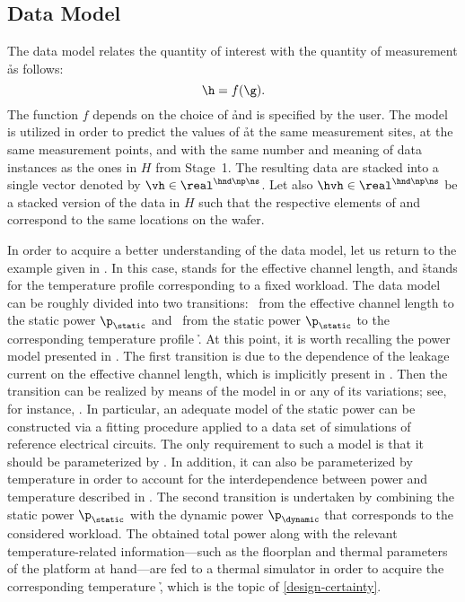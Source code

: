 \subsection{Data Model}

The data model relates the quantity of interest \g with the quantity of
measurement \h as follows:
\[
  \h = f(\g).
\]
The function $f$ depends on the choice of \h and is specified by the user. The
model is utilized in order to predict the values of \h at the same measurement
sites, at the same measurement points, and with the same number and meaning of
data instances as the ones in $H$ from Stage~1. The resulting data are stacked
into a single vector denoted by $\vh \in \real^{\hnd \np \ns}$. Let also $\hvh
\in \real^{\hnd \np \ns}$ be a stacked version of the data in $H$ such that the
respective elements of \vh and \hvh correspond to the same locations on the
wafer.

In order to acquire a better understanding of the data model, let us return to
the example given in . In this case, \g stands for the
effective channel length, and \h stands for the temperature profile
corresponding to a fixed workload. The data model can be roughly divided into
two transitions: \one~from the effective channel length \g to the static power
$\p_\static$ and \two~from the static power $\p_\static$ to the corresponding
temperature profile \h. At this point, it is worth recalling the power model
presented in . The first transition is due to the dependence
of the leakage current on the effective channel length, which is implicitly
present in . Then the transition can be realized by means of
the model in  or any of its variations; see, for instance,
\cite{chandrakasan2000, srivastava2010, juan2012}. In particular, an adequate
model of the static power can be constructed via a fitting procedure applied to
a data set of  simulations of reference electrical circuits. The only
requirement to such a model is that it should be parameterized by \g. In
addition, it can also be parameterized by temperature in order to account for
the interdependence between power and temperature described in
. The second transition is undertaken by combining the static
power $\p_\static$ with the dynamic power $\p_\dynamic$ that corresponds to the
considered workload. The obtained total power along with the relevant
temperature-related information---such as the floorplan and thermal parameters
of the platform at hand---are fed to a thermal simulator in order to acquire the
corresponding temperature \h, which is the topic of \cref{design-certainty}.

